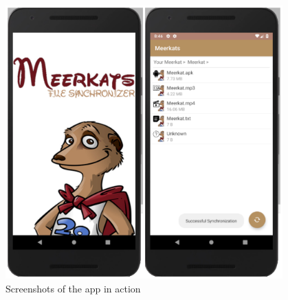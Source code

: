 \documentclass{article}
\begin{document}
\begin{figure}[h]
    \centering
    \includegraphics[width=0.95\textwidth]{collage1}
    \caption{Screenshots of the app in action}
    \label{fig:collage1}
\end{figure}
\end{document}
